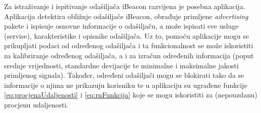 Za istraživanje i ispitivanje odašiljača iBeacon razvijena je posebna aplikacija. 
Aplikacija detektira obližnje odašiljače iBeacon, obrađuje primljene \textit{advertising} pakete i ispisuje osnovne informacije o odašiljaču, a može ispisati sve usluge (servise), karakteristike i opisnike odašiljača. 
Uz to, pomoću aplikacije mogu se prikupljati podaci od određenog odašiljača i ta funkcionalnost se može iskoristiti za kalibriranje određenog odašiljača, a i za izračun određenih informacija (poput srednje vrijednosti, standardne devijacije te minimalne i maksimalne jakosti primljenog signala). 
Također, određeni odašiljači mogu se blokirati tako da se informacije o njima ne prikazuju korisniku te u aplikaciju su ugrađene funkcije \eqref{eq:procjenaUdaljenosti} i \eqref{eq:rnFunkcija} koje se mogu iskoristiti za (nepouzdanu) procjenu udaljenosti.

